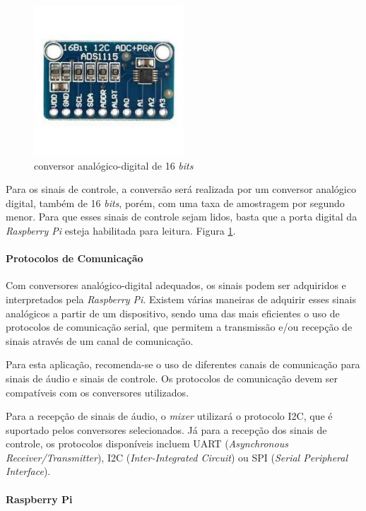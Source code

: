 \begin{figure}[h]
    \centering
    \includegraphics[width=0.5\textwidth]{figuras/fig64.jpg}
    \caption{conversor analógico-digital de 16 \textit{bits} \cite{eletroniklvEletronikComponentes}}
    \label{fig64}
\end{figure}

Para os sinais de controle, a conversão será realizada por um conversor analógico digital, também de 16 \textit{bits}, porém, com uma taxa de amostragem por segundo menor. Para que esses sinais de controle sejam lidos, basta que a porta digital da \textit{Raspberry Pi} esteja habilitada para leitura. Figura \ref{fig64}.

\paragraph{Protocolos de Comunicação}
Com conversores analógico-digital adequados, os sinais podem ser adquiridos e interpretados pela \textit{Raspberry Pi}. Existem várias maneiras de adquirir esses sinais analógicos a partir de um dispositivo, sendo uma das mais eficientes o uso de protocolos de comunicação serial, que permitem a transmissão e/ou recepção de sinais através de um canal de comunicação.

Para esta aplicação, recomenda-se o uso de diferentes canais de comunicação para sinais de áudio e sinais de controle. Os protocolos de comunicação devem ser compatíveis com os conversores utilizados.

Para a recepção de sinais de áudio, o \textit{mixer} utilizará o protocolo I2C, que é suportado pelos conversores selecionados. Já para a recepção dos sinais de controle, os protocolos disponíveis incluem UART (\textit{Asynchronous Receiver/Transmitter}), I2C (\textit{Inter-Integrated Circuit}) ou SPI (\textit{Serial Peripheral Interface}).

\paragraph{Raspberry Pi}

